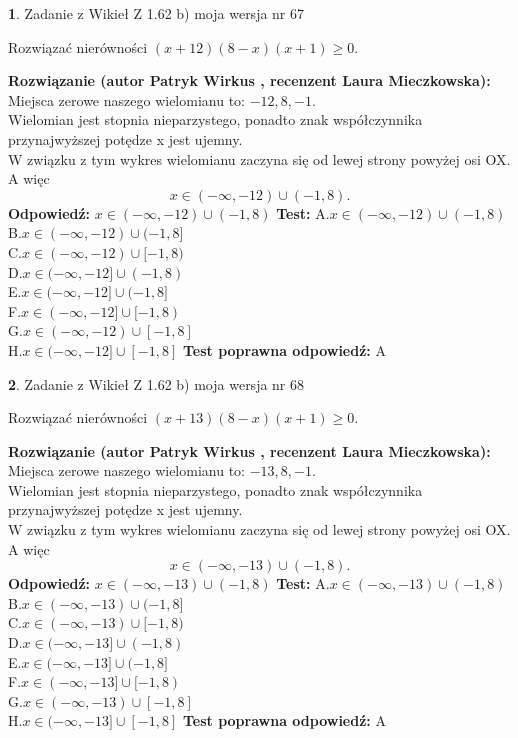 \documentclass[12pt, a4paper]{article}
\theoremstyle{definition} %
\newtheorem{zad}{}
\newcommand{\zadStart}[1]{\begin{zad}#1\newline}
\newcommand{\zadStop}{\end{zad}}
\newcommand{\rozwStart}[2]{\noindent \textbf{Rozwiązanie (autor #1 , recenzent #2): }\newline}
\newcommand{\rozwStop}{\newline}
\newcommand{\odpStart}{\noindent \textbf{Odpowiedź:}\newline}
\newcommand{\odpStop}{\newline}
\newcommand{\testStart}{\noindent \textbf{Test:}\newline}
\newcommand{\testStop}{\newline}
\newcommand{\kluczStart}{\noindent \textbf{Test poprawna odpowiedź:}\newline}
\newcommand{\kluczStop}{\newline}
\begin{document}
\zadStart{Zadanie z Wikieł Z 1.62 b) moja wersja nr 67}

Rozwiązać nierówności $(x+12)(8-x)(x+1)\ge0$.
\zadStop
\rozwStart{Patryk Wirkus}{Laura Mieczkowska}
Miejsca zerowe naszego wielomianu to: $-12, 8, -1$.\\
Wielomian jest stopnia nieparzystego, ponadto znak współczynnika przy\linebreak najwyższej potędze x jest ujemny.\\ W związku z tym wykres wielomianu zaczyna się od lewej strony powyżej osi OX. A więc $$x \in (-\infty,-12) \cup (-1,8).$$
\rozwStop
\odpStart
$x \in (-\infty,-12) \cup (-1,8)$
\odpStop
\testStart
A.$x \in (-\infty,-12) \cup (-1,8)$\\
B.$x \in (-\infty,-12) \cup (-1,8]$\\
C.$x \in (-\infty,-12) \cup [-1,8)$\\
D.$x \in (-\infty,-12] \cup (-1,8)$\\
E.$x \in (-\infty,-12] \cup (-1,8]$\\
F.$x \in (-\infty,-12] \cup [-1,8)$\\
G.$x \in (-\infty,-12) \cup [-1,8]$\\
H.$x \in (-\infty,-12] \cup [-1,8]$
\testStop
\kluczStart
A
\kluczStop



\zadStart{Zadanie z Wikieł Z 1.62 b) moja wersja nr 68}

Rozwiązać nierówności $(x+13)(8-x)(x+1)\ge0$.
\zadStop
\rozwStart{Patryk Wirkus}{Laura Mieczkowska}
Miejsca zerowe naszego wielomianu to: $-13, 8, -1$.\\
Wielomian jest stopnia nieparzystego, ponadto znak współczynnika przy\linebreak najwyższej potędze x jest ujemny.\\ W związku z tym wykres wielomianu zaczyna się od lewej strony powyżej osi OX. A więc $$x \in (-\infty,-13) \cup (-1,8).$$
\rozwStop
\odpStart
$x \in (-\infty,-13) \cup (-1,8)$
\odpStop
\testStart
A.$x \in (-\infty,-13) \cup (-1,8)$\\
B.$x \in (-\infty,-13) \cup (-1,8]$\\
C.$x \in (-\infty,-13) \cup [-1,8)$\\
D.$x \in (-\infty,-13] \cup (-1,8)$\\
E.$x \in (-\infty,-13] \cup (-1,8]$\\
F.$x \in (-\infty,-13] \cup [-1,8)$\\
G.$x \in (-\infty,-13) \cup [-1,8]$\\
H.$x \in (-\infty,-13] \cup [-1,8]$
\testStop
\kluczStart
A
\kluczStop
\end{document}
